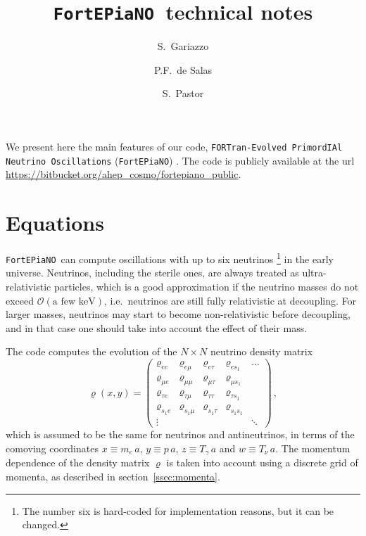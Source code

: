 \documentclass[notitlepage,nofootinbib,showpacs,preprintnumbers,amsmath,amssymb,superscriptaddress,prd,onecolumn]{revtex4-1}
\newcommand{\fortepiano}{\texttt{FortEPiaNO}}
\begin{document}
\title{\boldmath \fortepiano\ technical notes}

\author{S.\ Gariazzo}

\author{P.F.\ de Salas}

\author{S.\ Pastor}


\maketitle


We present here the main features of
our code, \texttt{FORTran-Evolved PrimordIAl Neutrino Oscillations}
(\fortepiano) \cite{Gariazzo:2019gyi}.
The code is publicly available at the url
\url{https://bitbucket.org/ahep_cosmo/fortepiano_public}.


\section{Equations}
\fortepiano\ can compute oscillations with up to six neutrinos%
\footnote{The number six is hard-coded for implementation reasons, but it can be changed.}
in the early universe.
Neutrinos, including the sterile ones, are always treated as ultra-relativistic particles, which is a good approximation if the
neutrino masses do not exceed $\mathcal{O}(\mbox{a few keV})$,
i.e.\ neutrinos are still fully relativistic at decoupling.
For larger masses, neutrinos may start to become non-relativistic before decoupling,
and in that case one should take into account the effect of their mass.

The code computes the evolution of the
$N\times N$ neutrino density matrix
\cite{deSalas:2016ztq,Mirizzi:2012we,Saviano:2013ktj,Mangano:2001iu}
\begin{equation}\label{eq:varrho-B4}
\varrho(x, y)
=
\left(
\begin{array}{ccccc}
\varrho_{ee}&\varrho_{e\mu}&\varrho_{e\tau}&\varrho_{es_1}&\ldots\\
\varrho_{\mu e}&\varrho_{\mu\mu}&\varrho_{\mu\tau}&\varrho_{\mu s_1}&\\
\varrho_{\tau e}&\varrho_{\tau\mu}&\varrho_{\tau\tau}&\varrho_{\tau s_1}&\\
\varrho_{s_1e}&\varrho_{s_1\mu}&\varrho_{s_1\tau}&\varrho_{s_1s_1}&\\
\vdots&&&&\ddots
\end{array}
\right)\,,
\end{equation}
which is assumed to be the same for neutrinos and antineutrinos,
in terms of the comoving coordinates
$x\equiv m_e\, a$, $y\equiv p\, a$, $z\equiv T_\gamma\, a$ and $w\equiv T_\nu\,a$.
The momentum dependence of the density matrix $\varrho$ is taken into account
using a discrete grid of momenta, as described in section~\ref{ssec:momenta}.
\end{document}
